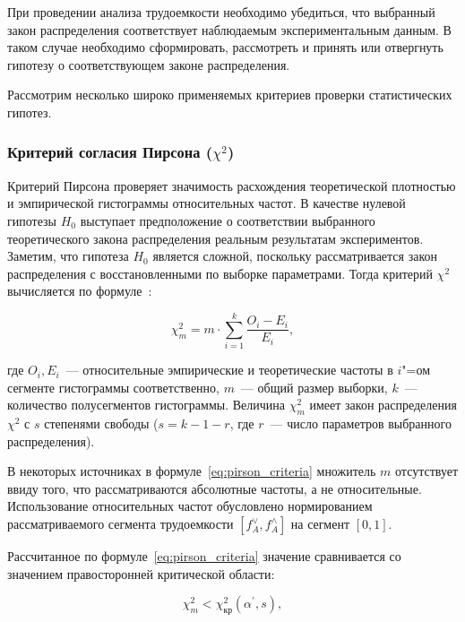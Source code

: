 \documentclass[a4paper, article, 14pt]{extarticle}
\begin{document}
При проведении анализа трудоемкости необходимо убедиться, что выбранный закон распределения соответствует наблюдаемым экспериментальным данным. В таком случае необходимо сформировать, рассмотреть и принять или отвергнуть гипотезу о соответствующем законе распределения.

Рассмотрим несколько широко применяемых критериев проверки статистических гипотез.

\subsubsection{Критерий согласия Пирсона ($\chi^2$)}\label{sec:pirson_criteria}

Критерий Пирсона проверяет значимость расхождения теоретической плотностью и эмпирической гистограммы относительных частот. В качестве нулевой гипотезы $H_0$ выступает предположение о соответствии выбранного теоретического закона распределения реальным результатам экспериментов. Заметим, что гипотеза $H_0$ является сложной, поскольку рассматривается закон распределения с восстановленными по выборке параметрами. Тогда критерий $\chi^2$ вычисляется по формуле~\cite{koroluk}:

\begin{equation}\label{eq:pirson_criteria}
	\chi_m^2 = m \cdot \sum_{i=1}^{k}{\frac{O_i - E_i}{E_i}},
\end{equation}

\noindent где $O_i, E_i$~--- относительные эмпирические и теоретические частоты в $i$"=ом сегменте гистограммы соответственно, $m$~--- общий размер выборки, $k$~--- количество полусегментов гистограммы. Величина $\chi_m^2$ имеет закон распределения $\chi^2$ с $s$ степенями свободы ($s = k - 1 - r$, где $r$~--- число параметров выбранного распределения).

В некоторых источниках в формуле~\eqref{eq:pirson_criteria} множитель $m$ отсутствует ввиду того, что рассматриваются абсолютные частоты, а не относительные. Использование относительных частот обусловлено нормированием рассматриваемого сегмента трудоемкости $[f_A^\vee, f_A^\wedge]$ на сегмент $[0, 1]$.

Рассчитанное по формуле~\eqref{eq:pirson_criteria} значение сравнивается со значением правосторонней критической области:

\begin{equation}\label{eq:pirson_criteria_test}
	\chi_m^2 < \chi_\text{кр}^2(\alpha^{'}, s),
\end{equation}
\end{document}

